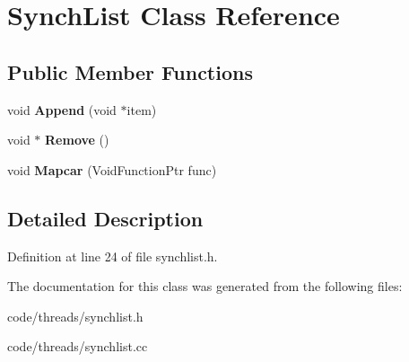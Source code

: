 \section{Synch\+List Class Reference}
\label{class_synch_list}
\subsection*{Public Member Functions}
\begin{DoxyCompactItemize}
\item 
void {\bfseries Append} (void $\ast$item)\label{class_synch_list_a8cd56b067f02d53025d8078f748e6b75}

\item 
void $\ast$ {\bfseries Remove} ()\label{class_synch_list_afe8d909e1ab9dce01ddd7d24716be56f}

\item 
void {\bfseries Mapcar} (Void\+Function\+Ptr func)\label{class_synch_list_ac9faf4621078baddee6890b0e184fc2d}

\end{DoxyCompactItemize}


\subsection{Detailed Description}


Definition at line 24 of file synchlist.\+h.



The documentation for this class was generated from the following files\+:\begin{DoxyCompactItemize}
\item 
code/threads/synchlist.\+h\item 
code/threads/synchlist.\+cc\end{DoxyCompactItemize}
